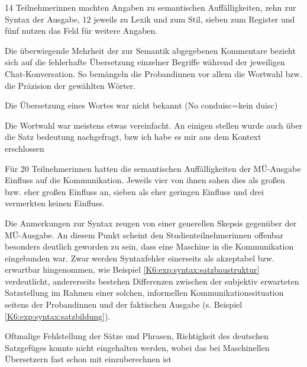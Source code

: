 14 Teilnehmer{\textperiodcentered}innen machten Angaben zu semantischen Auffälligkeiten, zehn zur Syntax der Ausgabe, 12 jeweils zu Lexik und zum Stil, sieben zum Register und fünf nutzen das Feld für \glqq weitere Angaben\grqq{}.

Die überwiegende Mehrheit der zur Semantik abgegebenen Kommentare bezieht sich auf die fehlerhafte Übersetzung einzelner Begriffe während der jeweiligen Chat-Konversation. So bemängeln die Proband{\textperiodcentered}innen vor allem die Wortwahl bzw. die Präzision der gewählten Wörter.

\begin{example}
	\label{K6:exp:semantik:precision}
	Die Übersetzung eines Wortes war nicht bekannt (No conduisc=kein duisc)
	\end{example}

\begin{example}
	\label{K6:exp:semantik:precision2}
	Die Wortwahl war meistens etwas vereinfacht. An einigen stellen wurde auch über die Satz bedeutung nachgefragt, bzw ich habe es mir aus dem Kontext erschlossen 
\end{example}

Für 20 Teilnehmer{\textperiodcentered}innen hatten die semantischen Auffälligkeiten der MÜ-Aus\-ga\-be Einfluss auf die Kommunikation. Jeweils vier von ihnen sahen dies als großen bzw. eher großen Einfluss an, sieben als eher geringen Einfluss und drei vermerkten keinen Einfluss.

Die Anmerkungen zur Syntax zeugen von einer generellen Skepsis gegenüber der MÜ-Ausgabe. An diesem Punkt scheint den Studienteilnehmer{\textperiodcentered}innen offenbar besonders deutlich geworden zu sein, dass eine Maschine in die Kommunikation eingebunden war. Zwar werden Syntaxfehler einerseits als akzeptabel bzw. erwartbar hingenommen, wie Beispiel \ref{K6:exp:syntax:satzbaustruktur} verdeutlicht, andererseits bestehen Differenzen zwischen der subjektiv erwarteten Satzstellung im Rahmen einer solchen, informellen Kommunikationssituation seitens der Proband{\textperiodcentered}innen und der faktischen Ausgabe (s. Beispiel\,\ref{K6:exp:syntax:satzbildung}).   


\begin{example}
	\label{K6:exp:syntax:satzbaustruktur}
	Oftmalige Fehlstellung der Sätze und Phrasen, Richtigkeit des deutschen Satzgefüges konnte nicht eingehalten werden, wobei das bei Maschinellen Übersetzern fast schon mit einzuberechnen ist
\end{example}


